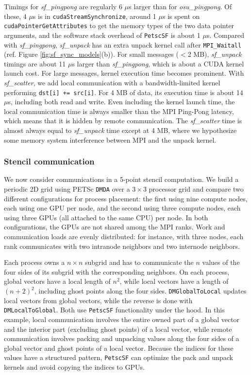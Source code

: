 \documentclass[10pt,journal,compsoc]{IEEEtran}
\begin{document}
Timings for \textit{sf\_pingpong} are regularly 6 $\mu$s larger than for \textit{osu\_pingpong}.
Of these, 4 $\mu$s is in \texttt{cudaStreamSynchronize}, around 1 $\mu$s is spent on  \texttt{cudaPointerGetAttributes}
to get the memory types of the two data pointer arguments,
and the software stack overhead of {\tt PetscSF} is about 1 $\mu$s.
Compared with
\textit{sf\_pingpong}, \textit{sf\_unpack} has an extra unpack kernel call after
\texttt{MPI\_Waitall} (ref. Figure \ref{fig:sf_sync_models}(b)). For small
messages ($<$2 MB), \textit{sf\_unpack} timings are about 11 $\mu$s larger than
\textit{sf\_pingpong}, which is about a CUDA kernel launch cost. For large
messages, kernel execution time becomes prominent.
With \textit{sf\_scatter}, we add local communication with a bandwidth-limited kernel performing
\texttt{dst[i] += src[i]}. For 4 MB of data, its
execution time is about 14 $\mu$s, including both
read and write. Even including the kernel launch time, the local communication
time is always smaller than the MPI Ping-Pong latency, which means that it is
hidden by remote communication. The
\textit{sf\_scatter} time is almost always equal to 
\textit{sf\_unpack} time except at 4 MB, where we hypothesize some memory system
interference between MPI and the unpack kernel.

\subsubsection{Stencil communication}
We now consider communications in a 5-point stencil computation. We build a periodic 2D grid
using PETSc \texttt{DMDA} over a $3\times3$ processor grid and compare two different configurations for process placement:
the first using nine compute nodes, each using one GPU per node, and the second using 
three compute nodes, each using three GPUs (all attached to the
same CPU) per node. In both configurations, the GPUs are not shared among the MPI ranks.
Work and communication loads are evenly distributed: for instance, with three nodes,
each rank communicates with two intranode neighbors and two
internode neighbors. 

Each process owns a $n\times n$ subgrid and has to communicate the
$n$ values of the four
sides of its subgrid with the corresponding neighbors.
On each
process, global vectors have a local length of $n^2$, while local vectors have a
length of $(n+2)^2$, including ghost points along the four sides.
\texttt{DMGlobalToLocal} updates local vectors from global vectors, while
the reverse is done with \texttt{DMLocalToGlobal}.  Both use \texttt{PetscSF} functionality under the hood.
In this example,
local communication involves the entire owned part of a
global vector and the interior part (excluding ghost points) of a local vector,
while remote communication involves packing and unpacking values along the four
sides of a global vector and ghost points of a local vector. Because the indices for these
values have a structured pattern, {\tt PetscSF} can optimize the pack and unpack kernels
and avoid copying the indices to GPUs.
\end{document}
